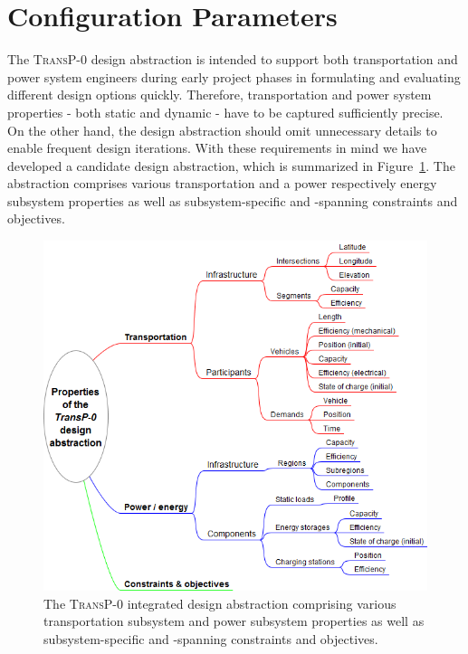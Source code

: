 \section{Configuration Parameters}
\label{proposed_model}

The \textsc{TransP-0} design abstraction is intended to support both transportation and power system engineers during early project phases in formulating and evaluating different design options quickly. Therefore, transportation and power system properties - both static and dynamic - have to be captured sufficiently precise. On the other hand, the design abstraction should omit unnecessary details to enable frequent design iterations. With these requirements in mind we have developed a candidate design abstraction, which is summarized in Figure~\ref{system_design}. The abstraction comprises various transportation and a power respectively energy subsystem properties as well as subsystem-specific and -spanning constraints and objectives.

\begin{figure}[h!]
	\includegraphics[width=\columnwidth]{./gfx/system_design.png}
	\caption{The \textsc{TransP-0} integrated design abstraction comprising various transportation subsystem and power subsystem properties as well as subsystem-specific and -spanning constraints and objectives.}
	\label{system_design}
\end{figure}

